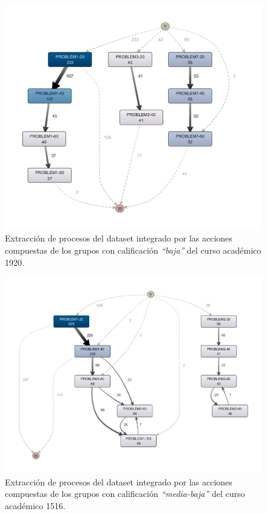 \begin{figure}[H]
    \centering
    \includegraphics[width=1.25\textwidth]{imagenes/DISCO_compound/Year1920WorstGrades.png}
    \caption{Extracción de procesos del dataset integrado por las acciones compuestas de los grupos con calificación \emph{``baja''} del curso académico 1920.}
    \label{fig:year1920WorstGrades}
\end{figure}

\begin{figure}[H]
    \centering
    \includegraphics[width=1.25\textwidth]{imagenes/DISCO_compound/Year1516MidLowGrades.png}
    \caption{Extracción de procesos del dataset integrado por las acciones compuestas de los grupos con calificación \emph{``media-baja''} del curso académico 1516.}
    \label{fig:year1516MidLowGrades}
\end{figure}

